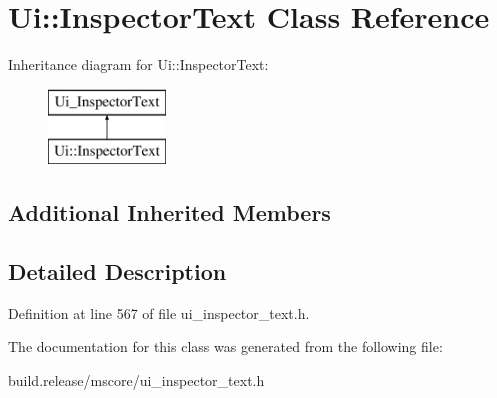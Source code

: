 \hypertarget{class_ui_1_1_inspector_text}{}\section{Ui\+:\+:Inspector\+Text Class Reference}
\label{class_ui_1_1_inspector_text}
Inheritance diagram for Ui\+:\+:Inspector\+Text\+:\begin{figure}[H]
\begin{center}
\leavevmode
\includegraphics[height=2.000000cm]{class_ui_1_1_inspector_text}
\end{center}
\end{figure}
\subsection*{Additional Inherited Members}


\subsection{Detailed Description}


Definition at line 567 of file ui\+\_\+inspector\+\_\+text.\+h.



The documentation for this class was generated from the following file\+:\begin{DoxyCompactItemize}
\item 
build.\+release/mscore/ui\+\_\+inspector\+\_\+text.\+h\end{DoxyCompactItemize}
